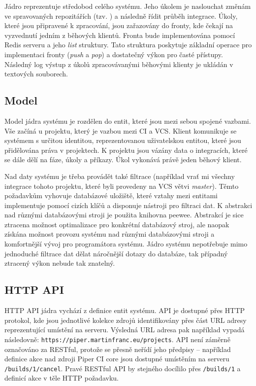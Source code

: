 Jádro reprezentuje středobod celého systému.
Jeho úkolem je naslouchat změnám ve spravovaných repozitářích (tzv. ) a následně řídit průběh integrace.
Úkoly, které jsou připravené k zpracování, jsou zařazovány do fronty, kde čekají na vyzvednutí jedním z běhových klientů.
Fronta bude implementována pomocí Redis serveru a jeho \textit{list} struktury.
Tato struktura poskytuje základní operace pro implementaci fronty (\textit{push} a \textit{pop}) a dostatečný výkon pro časté přístupy.
Následný log výstup z úkolů zpracovávanými běhovými klienty je ukládán v textových souborech.

\subsection{Model}

Model jádra systému je rozdělen do entit, které jsou mezi sebou spojené vazbami.
Vše začíná u projektu, který je vazbou mezi CI a VCS.
Klient komunikuje se systémem s určitou identitou, reprezentovanou uživatelskou entitou, které jsou přidělována práva v projektech.
K projektu jsou vázány data o integracích, které se dále dělí na fáze, úkoly a příkazy.
Úkol vykonává právě jeden běhový klient.


Nad daty systému je třeba provádět také filtrace (například vrať mi všechny integrace tohoto projektu, které byli provedeny na VCS větvi \textit{master}).
Těmto požadavkům vyhovuje databázové uložiště, které vztahy mezi entitami implementuje pomocí cizích klíčů a disponuje nástroji pro filtraci dat.
K abstrakci nad různými databázovými stroji je použita knihovna peewee.
Abstrakcí je sice ztracena možnost optimalizace pro konkrétní databázový stroj, ale naopak získána možnost provozu systému nad různými databázovými stroji a komfortnější vývoj pro programátora systému.
Jádro systému nepotřebuje mimo jednoduché filtrace dat dělat náročnější dotazy do databáze, tak případný ztracený výkon nebude tak znatelný.

\subsection{HTTP API}

HTTP API jádra vychází z definice entit systému.
API je dostupné přes HTTP protokol, kde jsou jednotlivé kolekce zdrojů identifikovány přes část URL adresy reprezentující umístění na serveru.
Výsledná URL adresa pak například vypadá následovně: \verb|https://piper.martinfranc.eu/projects|.
API není záměrně označováno za RESTful, protože se přesně neřídí jeho předpisy -- například definice akce nad zdroji Piper CI core jsou dostupné umístěním na serveru \verb|/builds/1/cancel|.
Pravé RESTful API by stejného docílilo přes \verb|/builds/1| a definicí akce v těle HTTP požadavku.

